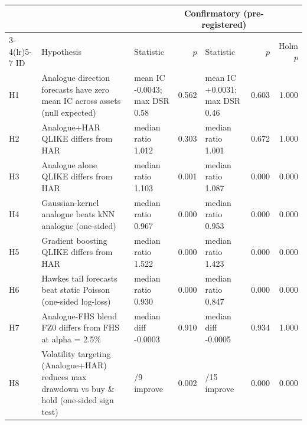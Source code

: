 \begin{tabular}{l>{\raggedright\arraybackslash}p{5.2cm}>{\raggedright\arraybackslash}p{2.6cm}r>{\raggedright\arraybackslash}p{2.6cm}rr}
\toprule
& & \multicolumn{2}{c}{Development (exploratory)} & \multicolumn{3}{c}{Confirmatory (pre-registered)} \\
\cmidrule(lr){3-4}\cmidrule(lr){5-7}
ID & Hypothesis & Statistic & $p$ & Statistic & $p$ & Holm $p$ \\
\midrule
H1 & Analogue direction forecasts have zero mean IC across assets (null expected) & mean IC -0.0043; max DSR 0.58 & 0.562 & mean IC +0.0031; max DSR 0.46 & 0.603 & 1.000\\
H2 & Analogue+HAR QLIKE differs from HAR & median ratio 1.012 & 0.303 & median ratio 1.001 & 0.672 & 1.000\\
H3 & Analogue alone QLIKE differs from HAR & median ratio 1.103 & 0.001 & median ratio 1.087 & 0.000 & 0.000\\
H4 & Gaussian-kernel analogue beats kNN analogue (one-sided) & median ratio 0.967 & 0.000 & median ratio 0.953 & 0.000 & 0.000\\
H5 & Gradient boosting QLIKE differs from HAR & median ratio 1.522 & 0.000 & median ratio 1.423 & 0.000 & 0.000\\
H6 & Hawkes tail forecasts beat static Poisson (one-sided log-loss) & median ratio 0.930 & 0.000 & median ratio 0.847 & 0.000 & 0.000\\
H7 & Analogue-FHS blend FZ0 differs from FHS at alpha = 2.5\% & median diff -0.0003 & 0.910 & median diff -0.0005 & 0.934 & 1.000\\
H8 & Volatility targeting (Analogue+HAR) reduces max drawdown vs buy \& hold (one-sided sign test) & 9/9 improve & 0.002 & 15/15 improve & 0.000 & 0.000\\
\bottomrule
\end{tabular}
